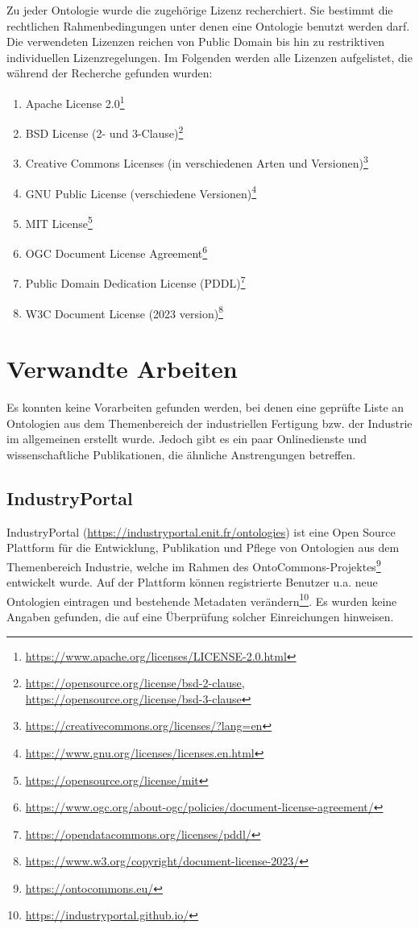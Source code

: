 \documentclass{article}
\begin{document}
Zu jeder Ontologie wurde die zugehörige Lizenz recherchiert.
Sie bestimmt die rechtlichen Rahmenbedingungen unter denen eine Ontologie benutzt werden darf.
Die verwendeten Lizenzen reichen von Public Domain bis hin zu restriktiven individuellen Lizenzregelungen.
Im Folgenden werden alle Lizenzen aufgelistet, die während der Recherche gefunden wurden:

\begin{enumerate}
    \item Apache License 2.0\footnote{\url{https://www.apache.org/licenses/LICENSE-2.0.html}}
    \item BSD License (2- und 3-Clause)\footnote{\url{https://opensource.org/license/bsd-2-clause}, \url{https://opensource.org/license/bsd-3-clause}}
    \item Creative Commons Licenses (in verschiedenen Arten und Versionen)\footnote{\url{https://creativecommons.org/licenses/?lang=en}}
    \item GNU Public License (verschiedene Versionen)\footnote{\url{https://www.gnu.org/licenses/licenses.en.html}}
    \item MIT License\footnote{\url{https://opensource.org/license/mit}}
    \item OGC Document License Agreement\footnote{\url{https://www.ogc.org/about-ogc/policies/document-license-agreement/}}
    \item Public Domain Dedication License (PDDL)\footnote{\url{https://opendatacommons.org/licenses/pddl/}}
    \item W3C Document License (2023 version)\footnote{\url{https://www.w3.org/copyright/document-license-2023/}}
\end{enumerate}


\section{Verwandte Arbeiten}

Es konnten keine Vorarbeiten gefunden werden, bei denen eine geprüfte Liste an Ontologien aus dem Themenbereich der industriellen Fertigung bzw. der Industrie im allgemeinen erstellt wurde.
Jedoch gibt es ein paar Onlinedienste und wissenschaftliche Publikationen, die ähnliche Anstrengungen betreffen.

\subsection{IndustryPortal}

IndustryPortal \cite{amdouni2023industryportal} (\url{https://industryportal.enit.fr/ontologies}) ist eine Open Source Plattform für die Entwicklung, Publikation und Pflege von Ontologien aus dem Themenbereich Industrie, welche im Rahmen des OntoCommons-Projektes\footnote{\url{https://ontocommons.eu/}} entwickelt wurde.
Auf der Plattform können registrierte Benutzer u.a. neue Ontologien eintragen und bestehende Metadaten verändern\footnote{\url{https://industryportal.github.io/}}.
Es wurden keine Angaben gefunden, die auf eine Überprüfung solcher Einreichungen hinweisen.
\end{document}
